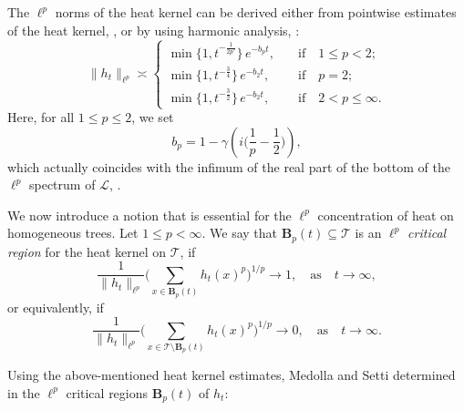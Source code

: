\documentclass[10pt,a4paper]{amsart}
\renewcommand\mathcal{\mathscr}
\theoremstyle{plain}
\theoremstyle{remark}
\theoremstyle{definition}
\begin{document}
    The $\ell^p$ norms of the heat kernel can be derived either from pointwise estimates of the heat kernel, \cite[p.1740]{MedSe}, or by using harmonic analysis, \cite[Lemma 2.1]{CMS}:
    \begin{equation}\label{eq:heatLpnorms}
        \|h_t\|_{\ell^p}\asymp \begin{cases}
            \min\{1, t^{-\frac{1}{2p'}}\}\,e^{-b_p t}, \quad &\text{if} \quad 1\leq p <2;\\
            \min\{1, t^{-\frac{3}{4}}\}\,e^{-b_2 t}, \quad &\text{if} \quad p=2;\\
           \min\{1, t^{-\frac{3}{2}}\}\,e^{-b_2 t}, \quad &\text{if} \quad 2 < p \leq \infty.
        \end{cases}
    \end{equation}
	Here, for all $1\leq p\leq 2$, we set
    \[
    b_p=1-\gamma\left( i \Big(\frac{1}{p}-\frac{1}{2}\Big)\right),
    \]
    which actually coincides with the infimum of the real part of the bottom of the $\ell^p$ spectrum of $\mathcal{L}$, \cite[p.4275]{CMS}.
    
	We now introduce a notion that is essential for the $\ell^p$ concentration of heat on homogeneous trees. Let $1\leq p < \infty$. We say that $\textbf{B}_p(t)\subseteq \mathcal{T}$ is an $\ell^p$ \emph{critical region} for the heat kernel on $\mathcal{T}$, if
	\begin{equation}\label{eq:critical}
	\frac{1}{\|h_t\|_{\ell^p}}\Bigg(\sum_{x\in\textbf{B}_p(t)}h_t(x)^p\Bigg)^{1/p}\to 1, \quad \text{as} \quad  t\to \infty, 
	\end{equation}
	or equivalently, if 
	\[
	\frac{1}{\|h_t\|_{\ell^p}}\Bigg(\sum_{x\in\mathcal{T}\setminus \textbf{B}_p(t)}h_t(x)^p\Bigg)^{1/p}\to 0, \quad \text{as} \quad  t\to \infty.
	\]
    
	Using the above-mentioned heat kernel estimates, Medolla and Setti determined in \cite{MedSe} the $\ell^p$ critical regions $\textbf{B}_p(t)$ of $h_t$:
    
\end{document}
